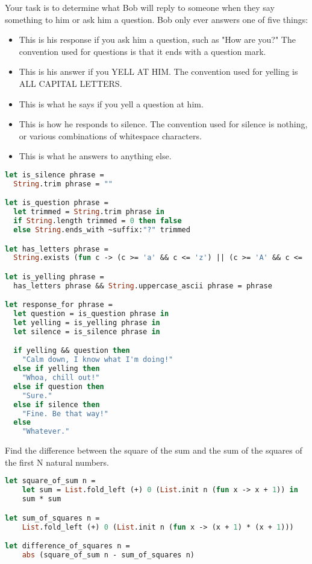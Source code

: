 \problem[Bob]
Your task is to determine what Bob will reply to someone when they say something to him or ask him a question.
Bob only ever answers one of five things:

\begin{itemize}
  \item {}
        This is his response if you ask him a question, such as "How are you?"
        The convention used for questions is that it ends with a question mark.
  \item {}
        This is his answer if you YELL AT HIM.
        The convention used for yelling is ALL CAPITAL LETTERS.
  \item {}
        This is what he says if you yell a question at him.
  \item {}
        This is how he responds to silence.
        The convention used for silence is nothing, or various combinations of whitespace characters.
  \item {}
        This is what he answers to anything else.
\end{itemize}

\begin{lstlisting}[language=OCaml]
let is_silence phrase =
  String.trim phrase = ""

let is_question phrase =
  let trimmed = String.trim phrase in
  if String.length trimmed = 0 then false
  else String.ends_with ~suffix:"?" trimmed

let has_letters phrase =
  String.exists (fun c -> (c >= 'a' && c <= 'z') || (c >= 'A' && c <= 'Z')) phrase

let is_yelling phrase =
  has_letters phrase && String.uppercase_ascii phrase = phrase

let response_for phrase =
  let question = is_question phrase in
  let yelling = is_yelling phrase in
  let silence = is_silence phrase in

  if yelling && question then
    "Calm down, I know what I'm doing!"
  else if yelling then
    "Whoa, chill out!"
  else if question then
    "Sure."
  else if silence then
    "Fine. Be that way!"
  else
    "Whatever."
\end{lstlisting}

Find the difference between the square of the sum and the sum of the squares of the first N natural numbers.

\begin{lstlisting}[language=OCaml]
let square_of_sum n = 
    let sum = List.fold_left (+) 0 (List.init n (fun x -> x + 1)) in
    sum * sum

let sum_of_squares n =
    List.fold_left (+) 0 (List.init n (fun x -> (x + 1) * (x + 1)))

let difference_of_squares n =
    abs (square_of_sum n - sum_of_squares n)
\end{lstlisting}

